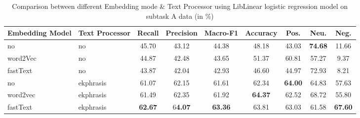 \begin{table*}[htbp!] %
    \centering
    \begin{tabular}{llccccccc}
    \midrule
    Embedding Model  &  Text Processor          & Recall         & Precision       & Macro-F1        & Accuracy & Pos. &Neu. & Neg.\\
    \midrule
    no        & no           & 45.70   & 43.12     & 44.38    & 48.18    & 43.03 & \bf74.68    & 11.66 \\
    word2Vec  & no           & 44.87   & 42.48     & 43.65    & 51.37    & 60.81    & 57.27    & 9.37  \\
    fastText  & no           & 43.87   & 42.04     & 42.93    & 46.60    & 44.97    & 72.93    & 8.21  \\
    no        & ekphrasis    & 61.07   & 62.15     & 61.61    & 62.34 & \bf64.00    & 64.83    & 57.63 \\
    word2vec  & ekphrasis    & 61.49   & 62.35     & 61.92 & \bf64.37    & 62.52    & 68.72    & 55.80 \\
    fastText  & ekphrasis & \bf62.67 & 6\bf4.07 & \bf63.36    & 63.81    & 63.03    & 61.58 & \bf67.60 \\
    \bottomrule
    \end{tabular}
\caption{Comparison between different Embedding mode \& Text Processor using LibLinear logistic regression model on subtask A data (in \%)}
\label{tab:embedding}
\end{table*}
